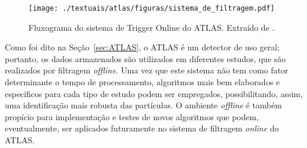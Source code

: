 \begin{figure}[h!]
	\centering
	\texttt{[image: ./textuais/atlas/figuras/sistema\_de\_filtragem.pdf]}\\
	\caption{Fluxograma do sistema de Trigger Online do ATLAS. Extraído de \cite{dos2006sistema}.}
	\label{fig:2T16}
\end{figure}


Como foi dito na Seção~\ref{sec:ATLAS}, o ATLAS é um detector de uso geral; portanto, os dados armazenados são utilizados em diferentes estudos, que são realizados por filtragem \emph{offline}. Uma vez que este sistema não tem como fator determinante o tempo de processamento, algoritmos mais bem elaborados e específicos para cada tipo de estudo podem ser empregados, possibilitando, assim, uma identificação mais robusta das partículas. O ambiente \emph{offline} é também propício para implementação e testes de novos algoritmos que podem, eventualmente, ser aplicados futuramente no sistema de filtragem \emph{online} do ATLAS.
